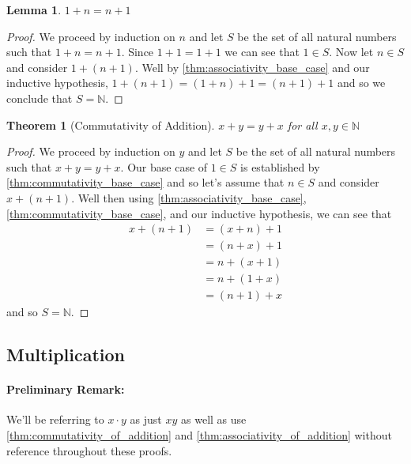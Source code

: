 \documentclass{article}
\theoremstyle{definition}
\theoremstyle{definition}
\theoremstyle{plain}
\theoremstyle{remark}
\theoremstyle{plain}
\newtheorem{theorem}{Theorem}[section]
\theoremstyle{remark}
\theoremstyle{plain}
\newtheorem{lemma}{Lemma}[section]
\theoremstyle{plain}
\theoremstyle{plain}
\theoremstyle{plain}
\begin{document}
\begin{lemma}
  \( 1 + n = n + 1 \)
  \label{thm:commutativity_base_case}
\end{lemma}

\begin{proof}
  We proceed by induction on \( n \) and let \( S \) be the set of all natural 
  numbers such that \( 1 + n = n + 1 \). Since \( 1 + 1 = 1 + 1 \) we can see 
  that \( 1 \in S \). Now let \( n \in S \) and consider \( 1 + (n + 1)\). Well
  by \autoref{thm:associativity_base_case} and our inductive hypothesis, 
  \( 1 + (n + 1) = (1 + n) + 1 = (n + 1) + 1 \) and so we conclude that 
  \( S = \mathbb{N} \).  
\end{proof}

\begin{theorem}[Commutativity of Addition]
  \( x + y = y + x \) for all \( x, y \in \mathbb{N} \) 
  \label{thm:commutativity_of_addition}
\end{theorem}

\begin{proof}
  We proceed by induction on \( y \) and let \( S \) be the set of all natural 
  numbers such that \( x + y = y + x \). Our base case of \( 1 \in S \) is 
  established by \autoref{thm:commutativity_base_case} and so let's assume that 
  \( n \in S \) and consider \( x + (n + 1) \). Well then using 
  \autoref{thm:associativity_base_case}, \autoref{thm:commutativity_base_case}, 
  and our inductive hypothesis, we can see that 
  \begin{align*}
    x + (n + 1) &= (x + n) + 1 \\
                &= (n + x) + 1 \\ 
                &= n + (x + 1) \\
                &= n + (1 + x) \\
                &= (n + 1) + x
  \end{align*}
  and so \( S = \mathbb{N} \).
\end{proof}

\newpage

\subsection{Multiplication}

\paragraph{Preliminary Remark:}
We'll be referring to \( x \cdot y \) as just \( xy \) as well as use 
\autoref{thm:commutativity_of_addition} and 
\autoref{thm:associativity_of_addition} without reference throughout these 
proofs.
\end{document}
